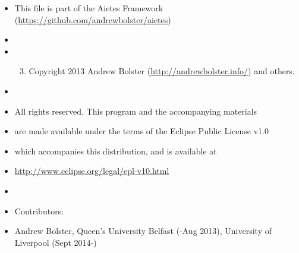 \documentclass[letterpaper,10pt,english]{sphinxmanual}
\begin{document}
\label{index:module-ephyra}\begin{itemize}
\item {} 
This file is part of the Aietes Framework (\href{https://github.com/andrewbolster/aietes}{https://github.com/andrewbolster/aietes})

\item {} 
\item {} \begin{enumerate}
\setcounter{enumi}{2}
\item {} 
Copyright 2013 Andrew Bolster (\href{http://andrewbolster.info/}{http://andrewbolster.info/}) and others.

\end{enumerate}

\item {} 
\item {} 
All rights reserved. This program and the accompanying materials

\item {} 
are made available under the terms of the Eclipse Public License v1.0

\item {} 
which accompanies this distribution, and is available at

\item {} 
\href{http://www.eclipse.org/legal/epl-v10.html}{http://www.eclipse.org/legal/epl-v10.html}

\item {} 
\item {} 
Contributors:

\item {} 
Andrew Bolster, Queen's University Belfast (-Aug 2013), University of Liverpool (Sept 2014-)

\end{itemize}
\end{document}
